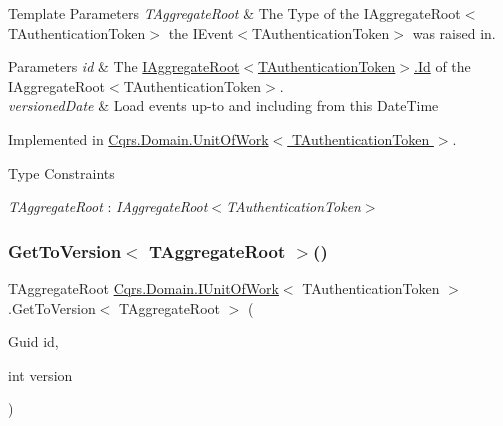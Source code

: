 \begin{DoxyTemplParams}{Template Parameters}
{\em T\+Aggregate\+Root} & The Type of the I\+Aggregate\+Root$<$\+T\+Authentication\+Token$>$ the I\+Event$<$\+T\+Authentication\+Token$>$ was raised in.\\
\hline
\end{DoxyTemplParams}

\begin{DoxyParams}{Parameters}
{\em id} & The \hyperlink{interfaceCqrs_1_1Domain_1_1IAggregateRoot_a04aa3198f1371afa345a58e8fcb713d7_a04aa3198f1371afa345a58e8fcb713d7}{I\+Aggregate\+Root$<$\+T\+Authentication\+Token$>$.\+Id} of the I\+Aggregate\+Root$<$\+T\+Authentication\+Token$>$.\\
\hline
{\em versioned\+Date} & Load events up-\/to and including from this Date\+Time\\
\hline
\end{DoxyParams}


Implemented in \hyperlink{classCqrs_1_1Domain_1_1UnitOfWork_aac25e1b9946b0d0337bda627671d0dae_aac25e1b9946b0d0337bda627671d0dae}{Cqrs.\+Domain.\+Unit\+Of\+Work$<$ T\+Authentication\+Token $>$}.

\begin{Desc}
\item[Type Constraints]\begin{description}
\item[{\em T\+Aggregate\+Root} : {\em I\+Aggregate\+Root$<$T\+Authentication\+Token$>$}]\end{description}
\end{Desc}
\mbox{\label{interfaceCqrs_1_1Domain_1_1IUnitOfWork_a449dde9a112fcce6aaab0e4c8b3b9a71_a449dde9a112fcce6aaab0e4c8b3b9a71}} 
\subsubsection{\texorpdfstring{Get\+To\+Version$<$ T\+Aggregate\+Root $>$()}{GetToVersion< TAggregateRoot >()}}
{\footnotesize\ttfamily T\+Aggregate\+Root \hyperlink{interfaceCqrs_1_1Domain_1_1IUnitOfWork}{Cqrs.\+Domain.\+I\+Unit\+Of\+Work}$<$ T\+Authentication\+Token $>$.Get\+To\+Version$<$ T\+Aggregate\+Root $>$ (\begin{DoxyParamCaption}\item[{Guid}]{id,  }\item[{int}]{version }\end{DoxyParamCaption})}



